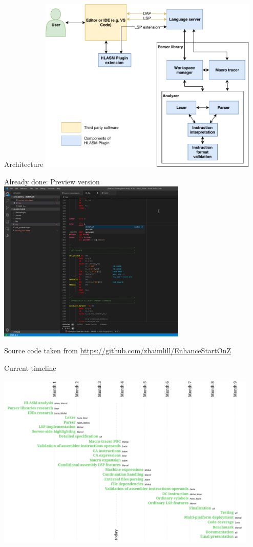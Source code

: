 \documentclass[10pt]{beamer}
\begin{document}
\begin{frame}{Architecture}
\centering
\includegraphics[width=10.5cm]{img/hlasm_architecture}
\end{frame}


\begin{frame}{Already done: Preview version}
\centering
\includegraphics[width=9cm]{img/screenshot}

\footnotesize
Source code taken from \url{https://github.com/zhaimlill/EnhanceStartOnZ}
\end{frame}


\begin{frame}{Current timeline}

\centering
\hspace*{-0.95cm}
\includegraphics[width=12.5cm]{img/timeline}

\end{frame}
\end{document}
